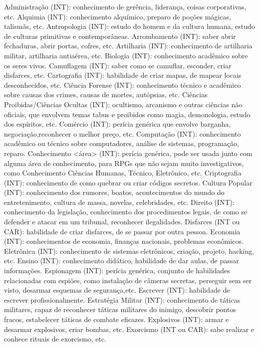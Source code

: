 Administração (INT): conhecimento de gerência, liderança, coisas corporativas, etc.
Alquimia (INT): conhecimento alquímico, preparo de poções mágicas, talismãs, etc.
Antropologia (INT): estudo do homem e da cultura humana, estudo de culturas primitivas e contemporâneas.
Arrombamento (INT): saber abrir fechaduras, abrir portas, cofres, etc.
Artilharia (INT): conhecimento de artilharia militar, artilharia antiaérea, etc.
Biologia (INT): conhecimento acadêmico sobre os seres vivos.
Camuflagem (INT): saber como se camuflar, esconder, criar disfarces, etc.
Cartografia (INT): habilidade de criar mapas, de mapear locais desconhecidos, etc.
Ciência Forense (INT): conhecimento técnico e acadêmico sobre causas dos crimes, causas de mortes, autópsias, etc.
Ciências Proibidas/Ciências Ocultas (INT): ocultismo, arcanismo e outras ciências não oficiais, que envolvem temas tabus e proibidos como magia, demonologia, estudo dos espíritos, etc.
Comércio (INT): perícia genérica que envolve barganha, negociação,reconhecer o melhor preço, etc.
Computação (INT): conhecimento acadêmico ou técnico sobre computadores, análise de sistemas, programação, reparo.
Conhecimento <área> (INT): perícia genérica, pode ser usada junto com alguma área de conhecimento, para RPGs que não sejam muito investigativos, como Conhecimento Ciências Humanas, Técnico, Eletrônico, etc.
Criptografia (INT): conhecimento de como quebrar ou criar códigos secretos.
Cultura Popular (INT): conhecimento dos rumores, boatos, acontecimentos do mundo do entretenimento, cultura de massa, novelas, celebridades, etc.
Direito (INT): conhecimento da legislação, conhecimento dos procedimentos legais, de como se defender e atacar em um tribunal, reconhecer ilegalidades.
Disfarces (INT ou CAR): habilidade de criar disfarces, de se passar por outra pessoa.
Economia (INT): conhecimentos de economia, finanças nacionais, problemas econômicos.
Eletrônica (INT): conhecimento de sistemas eletrônicos, criação, projeto, hacking, etc.
Ensino (INT): conhecimento didático, habilidade de dar aulas, de passar informações.
Espionagem (INT): perícia genérica, conjunto de habilidades relacionadas com espiões, como instalação de câmeras secretas, perseguir sem ser visto, desarmar esquemas de segurança,etc.
Escrever (INT): habilidade de escrever profissionalmente.
Estratégia Militar (INT): conhecimento de táticas militares, capaz de reconhecer táticas militares do inimigo, descobrir pontos fracos, estabelecer táticas de combate eficazes.
Explosivos (INT): armar e desarmar explosivos, criar bombas, etc.
Exorcismo (INT ou CAR): sabe realizar e conhece rituais de exorcismo, etc.
